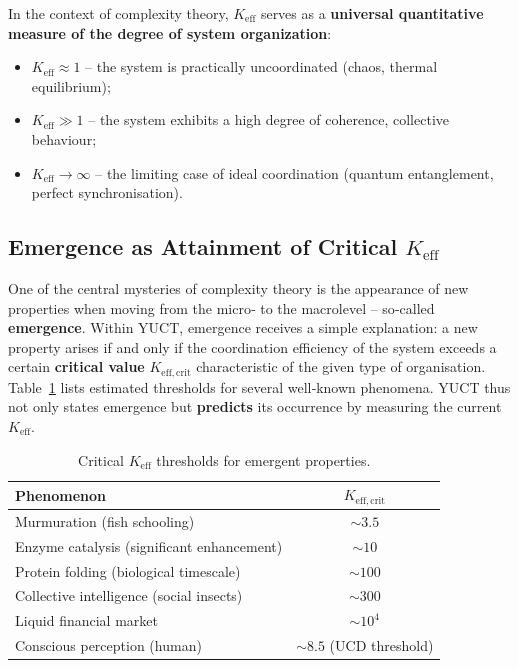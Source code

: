 \documentclass[11pt]{article}
\theoremstyle{remark}
\newcommand{\Keff}{K_{\mathrm{eff}}}
\newcommand{\Keffcrit}{K_{\mathrm{eff},\text{crit}}}
\begin{document}
	In the context of complexity theory, \(\Keff\) serves as a \textbf{universal quantitative measure of the degree of system organization}:
	\begin{itemize}
		\item \(\Keff \approx 1\) – the system is practically uncoordinated (chaos, thermal equilibrium);
		\item \(\Keff \gg 1\) – the system exhibits a high degree of coherence, collective behaviour;
		\item \(\Keff \to \infty\) – the limiting case of ideal coordination (quantum entanglement, perfect synchronisation).
	\end{itemize}
	
	\subsection{Emergence as Attainment of Critical \(\Keff\)}
	
	One of the central mysteries of complexity theory is the appearance of new properties when moving from the micro‑ to the macrolevel – so‑called \textbf{emergence}. Within YUCT, emergence receives a simple explanation: a new property arises if and only if the coordination efficiency of the system exceeds a certain \textbf{critical value} \(\Keffcrit\) characteristic of the given type of organisation. Table~\ref{tab:thresholds} lists estimated thresholds for several well‑known phenomena. YUCT thus not only states emergence but \textbf{predicts} its occurrence by measuring the current \(\Keff\).
	
	\begin{table}[H]
		\centering
		\caption{Critical \(\Keff\) thresholds for emergent properties.}
		\label{tab:thresholds}
		\begin{tabular}{l c}
			\toprule
			\textbf{Phenomenon} & \(\Keffcrit\) \\
			\midrule
			Murmuration (fish schooling) & \(\sim 3.5\) \\
			Enzyme catalysis (significant enhancement) & \(\sim 10\) \\
			Protein folding (biological timescale) & \(\sim 100\) \\
			Collective intelligence (social insects) & \(\sim 300\) \\
			Liquid financial market & \(\sim 10^4\) \\
			Conscious perception (human) & \(\sim 8.5\) (UCD threshold) \\
			\bottomrule
		\end{tabular}
	\end{table}
	
\end{document}
